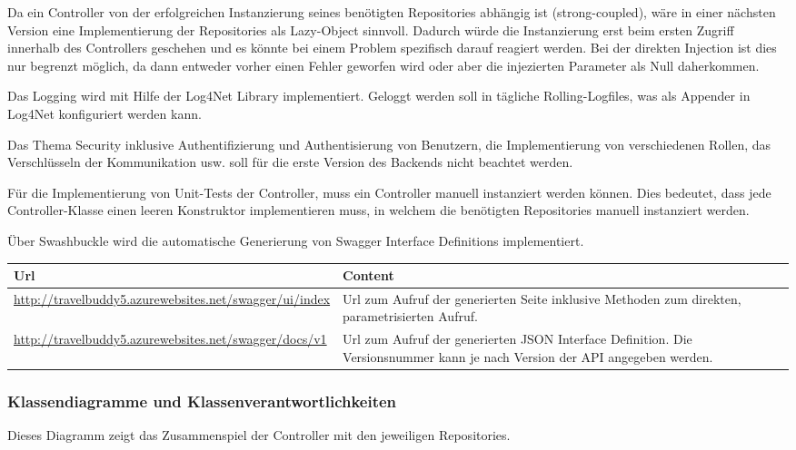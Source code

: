 Da ein Controller von der erfolgreichen Instanzierung seines ben\"otigten Repositories abh\"angig ist (strong-coupled),
w\"are in einer n\"achsten Version eine Implementierung der Repositories als Lazy-Object sinnvoll. Dadurch w\"urde die
Instanzierung erst beim ersten Zugriff innerhalb des Controllers geschehen und es k\"onnte bei einem Problem spezifisch
darauf reagiert werden. Bei der direkten Injection ist dies nur begrenzt m\"oglich, da dann entweder vorher einen Fehler
geworfen wird oder aber die injezierten Parameter als Null daherkommen.

\label{logging}
Das Logging wird mit Hilfe der Log4Net Library implementiert. Geloggt werden soll in t\"agliche Rolling-Logfiles, was
als Appender in Log4Net konfiguriert werden kann.

\label{security}
Das Thema Security inklusive Authentifizierung und Authentisierung von Benutzern, die Implementierung von verschiedenen
Rollen, das Verschl\"usseln der Kommunikation usw. soll f\"ur die erste Version des Backends nicht beachtet werden.

\label{testing}
F\"ur die Implementierung von Unit-Tests der Controller, muss ein Controller manuell instanziert werden k\"onnen. Dies
bedeutet, dass jede Controller-Klasse einen leeren Konstruktor implementieren muss, in welchem die ben\"otigten
Repositories manuell instanziert werden.

\label{swagger}
\"Uber Swashbuckle wird die automatische Generierung von Swagger Interface Definitions implementiert.

\begin{longtabu} to \textwidth { | X[l] | X[l] | }
\hline
\textbf{Url} & \textbf{Content} \\\hline
\endhead

\url{http://travelbuddy5.azurewebsites.net/swagger/ui/index} & Url zum Aufruf der
  generierten Seite inklusive Methoden zum direkten, parametrisierten Aufruf.\\\hline
\url{http://travelbuddy5.azurewebsites.net/swagger/docs/v1} & Url zum Aufruf der generierten
  JSON Interface Definition. Die Versionsnummer kann je nach Version der API angegeben werden.\\\hline
\end{longtabu}

\newpage
\subsubsection{Klassendiagramme und Klassenverantwortlichkeiten}\label{klassendiagramme}
Dieses Diagramm zeigt das Zusammenspiel der Controller mit den jeweiligen Repositories.

